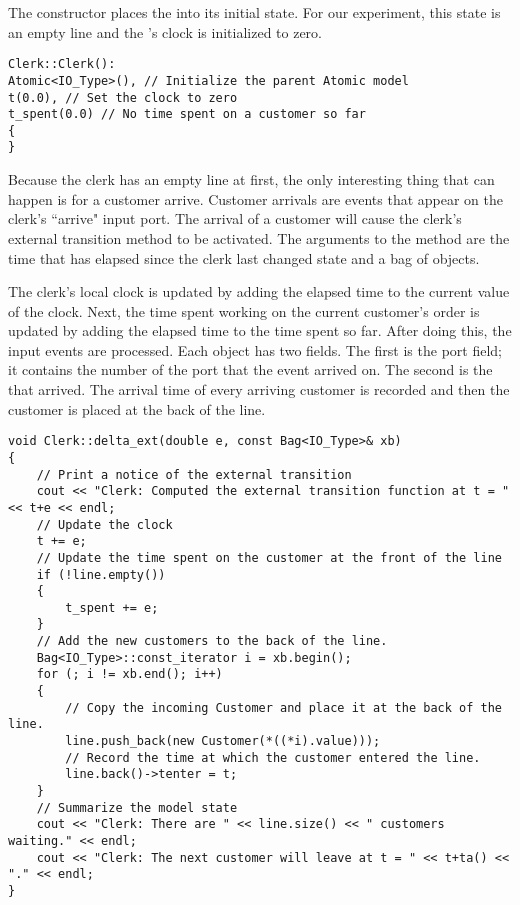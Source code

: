 The  constructor 
places the  into its initial state.
For our experiment, this state is an empty line and the 's clock
is initialized to zero.
\begin{verbatim}
Clerk::Clerk():
Atomic<IO_Type>(), // Initialize the parent Atomic model
t(0.0), // Set the clock to zero
t_spent(0.0) // No time spent on a customer so far
{
}
\end{verbatim}

Because the clerk has an empty line at first, the only interesting
thing that can happen is for a customer arrive. Customer arrivals
are events that appear on the clerk's ``arrive" input
port. The arrival of a customer will cause the clerk's external
transition method to be activated. The arguments to the method are
the time that has elapsed since the clerk last changed state and a
bag of  objects. 

The clerk's local clock is updated by adding the elapsed time to the current value of the clock. Next, the time spent working on the current customer's order is updated by adding the elapsed time to the time spent so far. After doing this, the input events are processed. Each  object has two fields.
The first is the port field; it contains the number of the port that the
event arrived on. The second is the  that arrived.
The arrival time of every arriving customer is recorded and then the customer is placed
at the back of the line.
\begin{verbatim}
void Clerk::delta_ext(double e, const Bag<IO_Type>& xb)
{
    // Print a notice of the external transition
    cout << "Clerk: Computed the external transition function at t = " << t+e << endl;
    // Update the clock
    t += e;
    // Update the time spent on the customer at the front of the line
    if (!line.empty())
    {
        t_spent += e;
    }
    // Add the new customers to the back of the line.
    Bag<IO_Type>::const_iterator i = xb.begin();
    for (; i != xb.end(); i++)
    {
        // Copy the incoming Customer and place it at the back of the line.
        line.push_back(new Customer(*((*i).value)));
        // Record the time at which the customer entered the line.
        line.back()->tenter = t;
    }
    // Summarize the model state
    cout << "Clerk: There are " << line.size() << " customers waiting." << endl;
    cout << "Clerk: The next customer will leave at t = " << t+ta() << "." << endl;
}
\end{verbatim}

